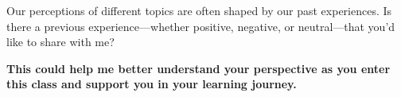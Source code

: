\documentclass{ximera}
\author{Bart Snapp}
\begin{document}
\begin{question}
    Our perceptions of different topics are often shaped by our past experiences.
    Is there a previous experience---whether positive, negative, or neutral---that
    you'd like to share with me?
    
    
    \textbf{This could help me better understand your
    perspective as you enter this class and support you in your learning journey.}
    \begin{freeResponse}
    \end{freeResponse}
\end{question}
\end{document}
